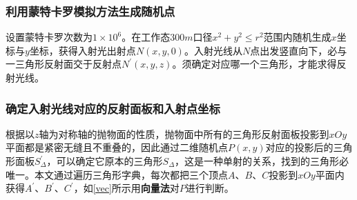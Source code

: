 \documentclass{myclass}
\begin{document}
\subsubsection{利用蒙特卡罗模拟方法生成随机点}
设置蒙特卡罗次数为$1 \times 10^6$。在工作态$300m$口径$x^2 + y^2 \leq r^2$范围内随机生成$x$坐标与$y$坐标，获得入射光出射点$N(x,y,0)$。入射光线从$N$点出发竖直向下，必与一三角形反射面交于反射点$N^{\prime}(x,y,z)$。须确定对应哪一个三角形，才能求得反射光线。
\subsubsection{确定入射光线对应的反射面板和入射点坐标}
根据以$z$轴为对称轴的抛物面的性质，抛物面中所有的三角形反射面板投影到$xOy$平面都是紧密无缝且不重叠的，因此通过二维随机点$P(x,y)$对应的投影后的三角形面板$S_{\Delta}^{\prime}$，可以确定它原本的三角形$S_{\Delta}$，这是一种单射的关系，找到的三角形必唯一。本文通过遍历三角形字典，每次都把三个顶点$A$、$B$、$C$投影到$xOy$平面内获得$A^{\prime}$、$B^{\prime}$、$C^{\prime}$，如\cref{vec}所示用\textbf{向量法}对$P$进行判断。
\end{document}
